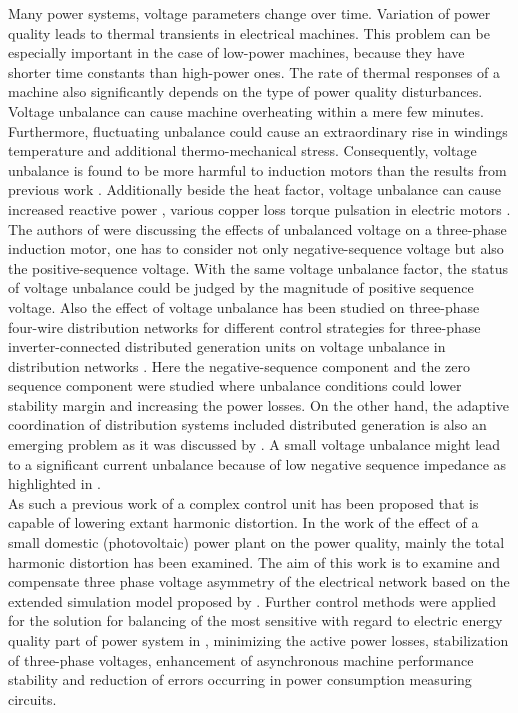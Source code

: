 Many power systems, voltage parameters change over time. Variation of power quality leads to thermal transients in electrical machines. This problem can be especially important in the case of low-power machines, because they have shorter time constants than high-power ones. The rate of thermal responses of a machine also significantly depends on the type of power quality disturbances. Voltage unbalance can cause  machine  overheating  within  a  mere  few  minutes. Furthermore,  fluctuating  unbalance  could  cause  an  extraordinary rise  in  windings  temperature  and  additional  thermo-mechanical stress.  Consequently,  voltage  unbalance  is  found  to  be  more harmful to induction motors than the results from previous work \cite{gnacinski2019induction}. Additionally beside the heat factor, voltage unbalance can cause increased reactive power \cite{savaghebi2012secondary}, various copper loss \cite{siddique2004effects} torque pulsation in electric motors \cite{brekken2005control}. The authors of \cite{lee1998effects} were discussing the effects of unbalanced voltage on a three-phase induction motor, one has to consider not only negative-sequence voltage but also the positive-sequence voltage. With the same voltage unbalance factor, the status of voltage unbalance could be judged by the magnitude of positive sequence voltage. Also the effect of voltage unbalance has been studied on three-phase four-wire distribution networks for different control strategies for three-phase inverter-connected distributed generation units on voltage unbalance in distribution networks \cite{meersman2011three}. Here the negative-sequence component and the zero sequence component were studied where unbalance conditions could lower stability margin and increasing the power losses. On the other hand, the adaptive coordination of distribution systems included distributed generation is also an emerging problem as it was discussed by \cite{ates2016}.  A small voltage unbalance might lead to a significant current unbalance because of low negative sequence impedance as highlighted in \cite{bina2011three}.\\
As such a previous work of \cite{gorbe2012reduction} a complex control unit has been proposed that is capable of lowering extant harmonic distortion. In the work of \cite{Gorbe2014experimental} the effect of a small domestic (photovoltaic) power plant on the power quality, mainly the total harmonic distortion has been examined. The aim of this work is to examine and compensate three phase voltage asymmetry of the electrical network based on the extended simulation model proposed by \cite{gorbe2012reduction}. Further control methods were applied for the solution for balancing of the most sensitive with regard to electric energy quality part of power system in \cite{korovkin2016uimethod},  minimizing the active power losses, stabilization of three-phase voltages, enhancement of asynchronous machine performance stability and reduction of errors occurring in power consumption measuring circuits.\\
